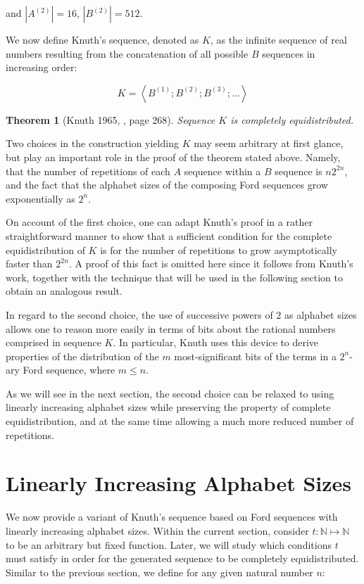 \documentclass[11pt,a4paper]{tesis}
\theoremstyle{plain}
\newtheorem*{theorem*}{Theorem}
\theoremstyle{definition}
\begin{document}
and $|A^{(2)}| = 16$, $|B^{(2)}| = 512$.

We now define Knuth's sequence, denoted as $K$, as the infinite sequence of real numbers resulting from the concatenation of all possible $B$ sequences in increasing order:

\begin{equation*}
  K = \left< B^{(1)} ; B^{(2)} ;  B^{(3)} ; \dots \right>
\end{equation*}

\begin{theorem*}[Knuth 1965, \cite{knuth-1965}, page 268]
  Sequence $K$ is completely equidistributed.
\end{theorem*}

Two choices in the construction yielding $K$ may seem arbitrary at first glance, but play an important role in the proof of the theorem stated above. Namely, that the number of repetitions of each $A$ sequence within a $B$ sequence is $n 2^{2n}$, and the fact that the alphabet sizes of the composing Ford sequences grow exponentially as $2^n$.

On account of the first choice, one can adapt Knuth's proof in a rather straightforward manner to show that a sufficient condition for the complete equidistribution of $K$ is for the number of repetitions to grow asymptotically faster than $2^{2n}$. A proof of this fact is omitted here since it follows from Knuth's work, together with the technique that will be used in the following section to obtain an analogous result.

In regard to the second choice, the use of successive powers of $2$ as alphabet sizes allows one to reason more easily in terms of bits about the rational numbers comprised in sequence $K$. In particular, Knuth uses this device to derive properties of the distribution of the $m$ most-significant bits of the terms in a $2^n$-ary Ford sequence, where $m \le n$.

As we will see in the next section, the second choice can be relaxed to using linearly increasing alphabet sizes while preserving the property of complete equidistribution, and at the same time allowing a much more reduced number of repetitions.

\section{Linearly Increasing Alphabet Sizes}

We now provide a variant of Knuth's sequence based on Ford sequences with linearly increasing alphabet sizes. Within the current section, consider $t : \mathbb{N} \mapsto \mathbb{N}$ to be an arbitrary but fixed function. Later, we will study which conditions $t$ must satisfy in order for the generated sequence to be completely equidistributed. Similar to the previous section, we define for any given natural number $n$:
\end{document}
